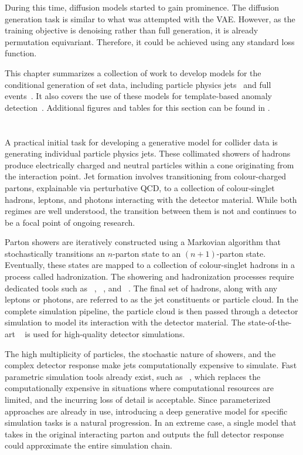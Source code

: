 During this time, diffusion models started to gain prominence.
The diffusion generation task is similar to what was attempted with the VAE\@.
However, as the training objective is denoising rather than full generation, it is already permutation equivariant.
Therefore, it could be achieved using any standard loss function.

This chapter summarizes a collection of work to develop models for the conditional generation of set data, including particle physics jets~\cite{PCJedi, EpicJedi, PCDroid} and full events~\cite{PIPPIN}.
It also covers the use of these models for template-based anomaly detection~\cite{Drapes, RadOT}.
Additional figures and tables for this section can be found in .

\section{\pcjedi}

A practical initial task for developing a generative model for collider data is generating individual particle physics jets.
These collimated showers of hadrons produce electrically charged and neutral particles within a cone originating from the interaction point.
Jet formation involves transitioning from colour-charged partons, explainable via perturbative QCD, to a collection of colour-singlet hadrons, leptons, and photons interacting with the detector material.
While both regimes are well understood, the transition between them is not and continues to be a focal point of ongoing research.

Parton showers are iteratively constructed using a Markovian algorithm that stochastically transitions an $n$-parton state to an $(n+1)$-parton state.
Eventually, these states are mapped to a collection of colour-singlet hadrons in a process called hadronization.
The showering and hadronization processes require dedicated tools such as \pythia~\cite{Pythia8}, \sherpa~\cite{Sherpa}, and \herwig~\cite{Herwig}.
The final set of hadrons, along with any leptons or photons, are referred to as the jet constituents or particle cloud.
In the complete simulation pipeline, the particle cloud is then passed through a detector simulation to model its interaction with the detector material.
The state-of-the-art \geant~\cite{Geant4} is used for high-quality detector simulations.

The high multiplicity of particles, the stochastic nature of showers, and the complex detector response make jets computationally expensive to simulate.
Fast parametric simulation tools already exist, such as \delphes~\cite{Delphes}, which replaces the computationally expensive \geant in situations where computational resources are limited, and the incurring loss of detail is acceptable.
Since parameterized approaches are already in use, introducing a deep generative model for specific simulation tasks is a natural progression.
In an extreme case, a single model that takes in the original interacting parton and outputs the full detector response could approximate the entire simulation chain.


